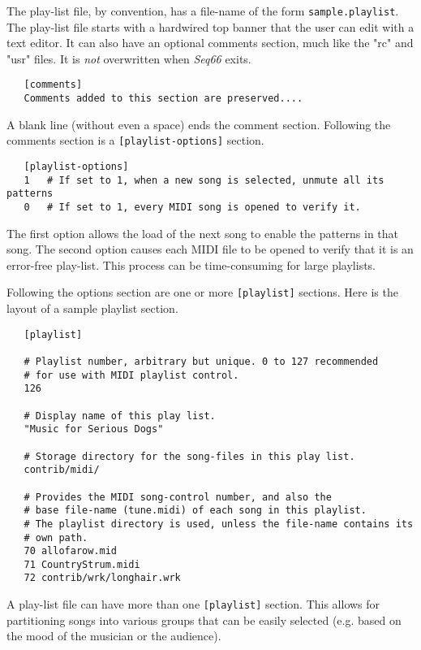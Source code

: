    The play-list file, by convention, has a file-name of the form
   \texttt{sample.playlist}.
   The play-list file starts with a hardwired top banner that the user can edit
   with a text editor.  It can also have an optional comments section, much
   like the "rc" and "usr" files.  It is \textsl{not} overwritten
   when \textsl{Seq66} exits.

   \begin{verbatim}
   [comments]
   Comments added to this section are preserved....

   \end{verbatim}

   A blank line (without even a space) ends the comment section.
   Following the comments section is a \texttt{[playlist-options]} section.

   \begin{verbatim}
   [playlist-options]
   1   # If set to 1, when a new song is selected, unmute all its patterns
   0   # If set to 1, every MIDI song is opened to verify it.
   \end{verbatim}

   The first option allows the load of the next song to enable the patterns in
   that song.
   The second option causes each MIDI file to be opened to verify that it is an
   error-free play-list.  This process can be time-consuming for large
   playlists.

   Following the options section are one or more \texttt{[playlist]} sections.
   Here is the layout of a sample playlist section.

   \begin{verbatim}
   [playlist]

   # Playlist number, arbitrary but unique. 0 to 127 recommended
   # for use with MIDI playlist control.
   126

   # Display name of this play list.
   "Music for Serious Dogs"

   # Storage directory for the song-files in this play list.
   contrib/midi/

   # Provides the MIDI song-control number, and also the
   # base file-name (tune.midi) of each song in this playlist.
   # The playlist directory is used, unless the file-name contains its
   # own path.
   70 allofarow.mid
   71 CountryStrum.midi
   72 contrib/wrk/longhair.wrk
   \end{verbatim}

   A play-list file can have more than one \texttt{[playlist]} section.  This
   allows for partitioning songs into various groups that can be easily
   selected (e.g. based on the mood of the musician or the audience).

